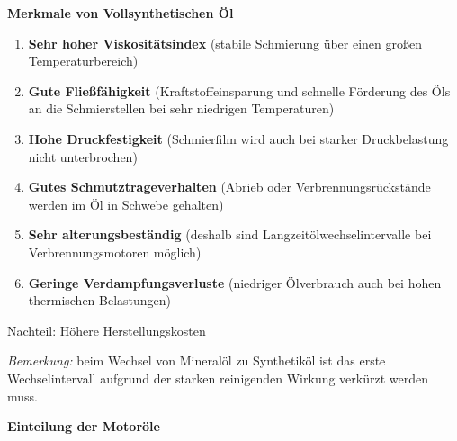 \textbf{Merkmale von Vollsynthetischen Öl}

\begin{enumerate}
\item
  \textbf{Sehr hoher Viskositätsindex} (stabile Schmierung über einen
  großen Temperaturbereich)
\item
  \textbf{Gute Fließfähigkeit} (Kraftstoffeinsparung und schnelle
  Förderung des Öls an die Schmierstellen bei sehr niedrigen
  Temperaturen)
\item
  \textbf{Hohe Druckfestigkeit} (Schmierfilm wird auch bei starker
  Druckbelastung nicht unterbrochen)
\item
  \textbf{Gutes Schmutztrageverhalten} (Abrieb oder
  Verbrennungsrückstände werden im Öl in Schwebe gehalten)
\item
  \textbf{Sehr alterungsbeständig} (deshalb sind
  Langzeitölwechselintervalle bei Verbrennungsmotoren möglich)
\item
  \textbf{Geringe Verdampfungsverluste} (niedriger Ölverbrauch auch bei
  hohen thermischen Belastungen)
\end{enumerate}

Nachteil: Höhere Herstellungskosten

\emph{Bemerkung:} beim Wechsel von Mineralöl zu Synthetiköl ist das
erste Wechselintervall aufgrund der starken reinigenden Wirkung verkürzt
werden muss.

\textbf{Einteilung der Motoröle}

